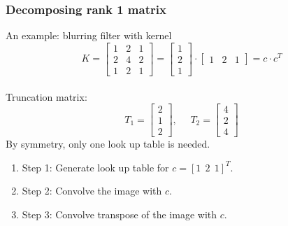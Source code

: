 \documentclass{beamer}
\begin{document}
\begin{frame}
\frametitle{Decomposing rank 1 matrix}
An example: blurring filter with kernel
$$
K=
\begin{bmatrix}
1 & 2 & 1\\
2 & 4 & 2\\
1 & 2 & 1
\end{bmatrix}
=
\begin{bmatrix}
1 \\
2 \\
1 
\end{bmatrix}
\cdot
\begin{bmatrix}
1 & 2 & 1
\end{bmatrix}
=c\cdot c^T
$$
\\
Truncation matrix: 
$$
T_1=
\begin{bmatrix}
2 \\
1 \\
2 
\end{bmatrix}
, \ \ \ \ \ \ 
T_2=
\begin{bmatrix}
4 \\
2 \\
4 
\end{bmatrix}
$$
By symmetry, only one look up table is needed.
\begin{enumerate}
\item Step 1: Generate look up table for $c=[1\ \  2\ \  1]^T$.
\item Step 2: Convolve the image with $c$. 
\item Step 3: Convolve transpose of the image with $c$. 
\end{enumerate}
\end{frame}
\end{document}
